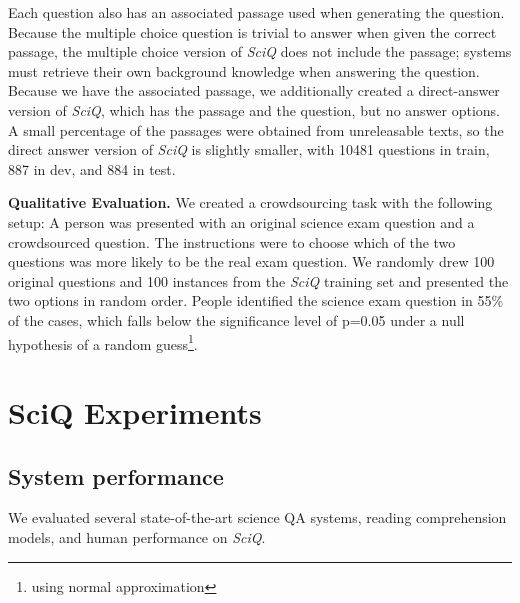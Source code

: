 Each question also has an associated passage used when generating the question.  Because the multiple choice question is trivial to answer when given the correct passage, the multiple choice version of \emph{SciQ} does not include the passage; systems must retrieve their own background knowledge when answering the question.  Because we have the associated passage, we additionally created a direct-answer version of \emph{SciQ}, which has the passage and the question, but no answer options.  A small percentage of the passages were obtained from unreleasable texts, so the direct answer version of \emph{SciQ} is slightly smaller, with 10481 questions in train, 887 in dev, and 884 in test.

\textbf{Qualitative Evaluation.} We created a crowdsourcing task with the following setup: A person was presented with an original science exam question and a crowdsourced question. The instructions were to choose which of the two questions was more likely to be the real exam question. We randomly drew 100 original questions and 100 instances from the \emph{SciQ} training set and presented the two options in random order. People identified the science exam question in
55\% of the cases, which falls below the significance level of p=0.05 under a null hypothesis of a random guess\footnote{using normal approximation}.

\section{SciQ Experiments}

\subsection{System performance}

We evaluated several state-of-the-art science QA systems, reading comprehension models, and human performance on \emph{SciQ}.

